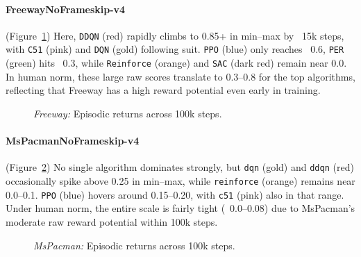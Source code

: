 \paragraph{FreewayNoFrameskip-v4}
(Figure~\ref{fig:freeway_comparison_combined})
Here, \texttt{DDQN} (red) rapidly climbs to 0.85+ in min--max by ~15k steps, 
with \texttt{C51} (pink) and \texttt{DQN} (gold) following suit. 
\texttt{PPO} (blue) only reaches ~0.6, 
\texttt{PER} (green) hits ~0.3, while \texttt{Reinforce} (orange) and \texttt{SAC} (dark red) 
remain near 0.0. 
In human norm, these large raw scores translate to 0.3--0.8 for the top algorithms, 
reflecting that Freeway has a high reward potential even early in training.
\begin{figure} 
	\centering
	\quad
	\caption{\emph{Freeway:} Episodic returns across 100k steps.}
	\label{fig:freeway_comparison_combined}
\end{figure}

\paragraph{MsPacmanNoFrameskip-v4}
(Figure~\ref{fig:mspacman_comparison_combined})
No single algorithm dominates strongly, but \texttt{dqn} (gold) and \texttt{ddqn} (red) 
occasionally spike above 0.25 in min--max, while \texttt{reinforce} (orange) remains 
near 0.0--0.1. \texttt{PPO} (blue) hovers around 0.15--0.20, 
with \texttt{c51} (pink) also in that range. 
Under human norm, the entire scale is fairly tight (~0.0--0.08) 
due to MsPacman's moderate raw reward potential within 100k steps.

\begin{figure} 
	\centering
	\quad
	\caption{\emph{MsPacman:} Episodic returns across 100k steps.}
	\label{fig:mspacman_comparison_combined}
\end{figure}

